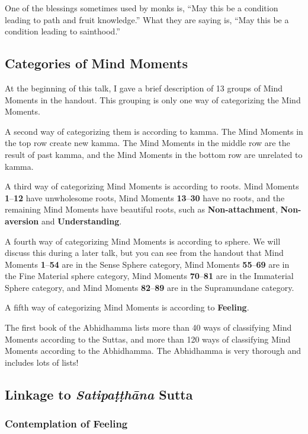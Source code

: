One of the blessings sometimes used by monks is, “May this be a condition leading to path and fruit knowledge.” What they are saying is, “May this be a condition leading to sainthood.”

\pagebreak

\subsection*{Categories of Mind Moments}

At the beginning of this talk, I gave a brief description of 13 groups of Mind Moments in the handout. This grouping is only one way of categorizing the Mind Moments.

A second way of categorizing them is according to kamma. The Mind Moments in the top row create new kamma. The Mind Moments in the middle row are the result of past kamma, and the Mind Moments in the bottom row are unrelated to kamma.

A third way of categorizing Mind Moments is according to roots. Mind Moments \textbf{1}--\textbf{12} have unwholesome roots, Mind Moments \textbf{13}--\textbf{30} have no roots, and the remaining Mind Moments have beautiful roots, such as \textbf{Non-attachment}, \textbf{Non-aversion} and \textbf{Understanding}.

A fourth way of categorizing Mind Moments is according to sphere. We will discuss this during a later talk, but you can see from the handout that Mind Moments \textbf{1}--\textbf{54} are in the Sense Sphere category, Mind Moments \textbf{55}--\textbf{69} are in the Fine Material sphere category, Mind Moments \textbf{70}--\textbf{81} are in the Immaterial Sphere category, and Mind Moments \textbf{82}--\textbf{89} are in the Supramundane category.

A fifth way of categorizing Mind Moments is according to \textbf{Feeling}.

The first book of the Abhidhamma lists more than 40 ways of classifying Mind Moments according to the Suttas, and more than 120 ways of classifying Mind Moments according to the Abhidhamma. The Abhidhamma is very thorough and includes lots of lists!

\subsection*{Linkage to \textit{Satipaṭṭhāna} Sutta}

\subsubsection*{Contemplation of \textbf{Feeling}}

